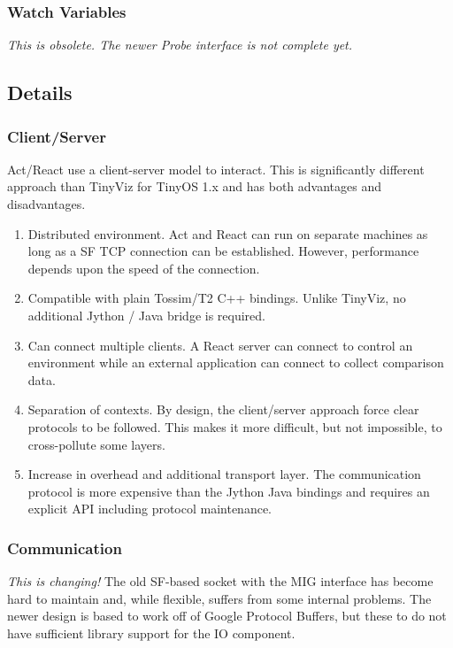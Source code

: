 \subsubsection{Watch Variables}

{\em This is obsolete. The newer Probe interface is not complete yet.}


\subsection{Details}

\subsubsection{Client/Server}

Act/React use a client-server model to interact. This is significantly
different approach than TinyViz for TinyOS 1.x and has both advantages
and disadvantages.

\begin{enumerate}
\item Distributed environment. Act and React can run on separate
  machines as long as a SF TCP connection can be established. However,
  performance depends upon the speed of the connection.
\item Compatible with plain Tossim/T2 C++ bindings. Unlike TinyViz, no
  additional Jython / Java bridge is required.
\item Can connect multiple clients. A React server can connect to
  control an environment while an external application can connect to
  collect comparison data.
\item Separation of contexts. By design, the client/server approach
  force clear protocols to be followed. This makes it more difficult,
  but not impossible, to cross-pollute some layers.
\item Increase in overhead and additional transport layer. The
  communication protocol is more expensive than the Jython Java
  bindings and requires an explicit API including protocol
  maintenance.
\end{enumerate}

\subsubsection{Communication}

{\em This is changing!}  The old SF-based socket with the MIG
interface has become hard to maintain and, while flexible, suffers
from some internal problems.  The newer design is based to work off of
Google Protocol Buffers, but these to do not have sufficient library
support for the IO component.

